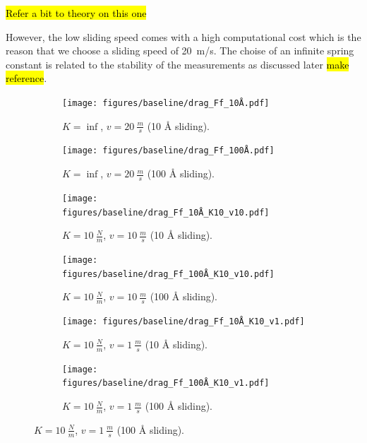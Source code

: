 \hl{Refer a bit to theory on this one}


However, the low sliding speed comes with a high computational cost which is the reason that we choose a sliding speed of \SI{20}{m/s}. The choise of an infinite spring constant is related to the stability of the measurements as discussed later \hl{make reference}.


\begin{figure}[H]
  \centering
  \begin{subfigure}[t]{0.49\textwidth}
      \centering
      \texttt{[image: figures/baseline/drag\_Ff\_10Å.pdf]}
      \caption{$K = \inf$, $v = \SI{20}{\frac{m}{s}}$ (10 Å sliding).}
      \label{fig:drag_Ff_10}
  \end{subfigure}
  \hfill
  \begin{subfigure}[t]{0.49\textwidth}
      \centering
      \texttt{[image: figures/baseline/drag\_Ff\_100Å.pdf]}
      \caption{$K = \inf$, $v = \SI{20}{\frac{m}{s}}$ (100 Å sliding).}
      \label{fig:drag_Ff_100}
    \end{subfigure}
    \hfill
    \begin{subfigure}[t]{0.49\textwidth}
      \centering
      \texttt{[image: figures/baseline/drag\_Ff\_10Å\_K10\_v10.pdf]}
      \caption{$K = \SI{10}{\frac{N}{m}}$, $v = \SI{10}{\frac{m}{s}}$ (10 Å sliding).}
      \label{fig:drag_Ff_10_K10_v10}
    \end{subfigure}
    \hfill
    \begin{subfigure}[t]{0.49\textwidth}
      \centering
      \texttt{[image: figures/baseline/drag\_Ff\_100Å\_K10\_v10.pdf]}
      \caption{$K = \SI{10}{\frac{N}{m}}$, $v = \SI{10}{\frac{m}{s}}$ (100 Å sliding).}
      \label{fig:drag_Ff_100_K10_v10}
  \end{subfigure}
  \hfill
    \begin{subfigure}[t]{0.49\textwidth}
      \centering
      \texttt{[image: figures/baseline/drag\_Ff\_10Å\_K10\_v1.pdf]}
      \caption{$K = \SI{10}{\frac{N}{m}}$, $v = \SI{1}{\frac{m}{s}}$ (10 Å sliding).}
      \label{fig:drag_Ff_10_K10_v1}
    \end{subfigure}
    \hfill
    \begin{subfigure}[t]{0.49\textwidth}
      \centering
      \texttt{[image: figures/baseline/drag\_Ff\_100Å\_K10\_v1.pdf]}
      \caption{$K = \SI{10}{\frac{N}{m}}$, $v = \SI{1}{\frac{m}{s}}$ (100 Å sliding).}

\end{subfigure}
\end{figure}
